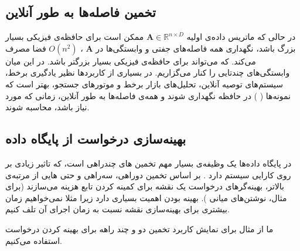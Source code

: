 \subsection{
تخمین فاصله‌ها به طور آنلاین
}
در حالی که ماتریس داده‌ی اولیه 
$\mathbf{A} \in \mathbb{R}^{n \times D}$
ممکن است برای حافظه‌ی فیزیکی بسیار بزرگ باشد، نگهداری
همه فاصله‌های جفتی و وابستگی‌ها در 
$\mathbf{A}$
،
$O(n^2)$
فضا مصرف می‌کند. که می‌تواند برای حافظه‌ی فیزیکی بسیار بزرگتر باشد. در این میان وابستگی‌های چندتایی را کنار می‌گزاریم. در بسیاری از کاربردها نظیر یادگیری برخط، سیستم‌های توصیه آنلاین، تحلیل‌های بازار برخط و موتورهای جستجو، بهتر است که نمونه‌ها (
) در حافظه نگهداری شوند و همه‌ی فاصله‌ها به طور آنلاین، زمانی که مورد نیاز باشد، محاسبه شوند.

\subsection{
بهینه‌سازی درخواست از پایگاه داده
}

در پایگاه داده‌ها یک وظیفه‌ی بسیار مهم تخمین 
های چندراهی است، که تاثیر زیادی بر روی کارایی سیستم دارد
\cite{litez81}
. بر اساس تخمین دوراهی، سه‌راهی و حتی 
هایی از مرتبه‌ی بالاتر، بهینه‌گرهای درخواست یک نقشه برای کمینه کردن تابع هزینه می‌سازند (برای مثال، نوشتن‌های میانی
). بهینه بودن اهمیت بسیاری دارد زیرا مثلا نمی‌خواهیم زمان بیشتری برای بهینه‌سازی نقشه نسبت به زمان اجرای آن تلف کنیم.

ما از مثال 
برای نمایش کاربرد تخمین دو و چند راهه برای بهینه کردن درخواست استفاده می‌کنیم.

